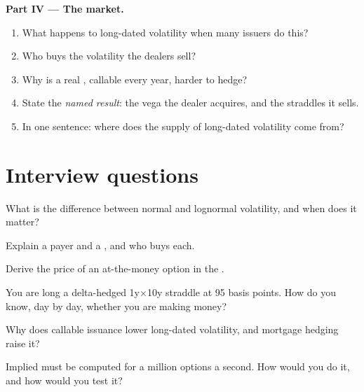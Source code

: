 \begin{problem}
\medskip\noindent\textbf{Part IV --- The market.}
\begin{enumerate}[resume]
\item What happens to long-dated  volatility when many issuers do this?
\item Who buys the volatility the dealers sell?
\item Why is a real , callable every year, harder to hedge?
\item State the \emph{named result}: the vega the dealer acquires, and the
straddles it sells.
\item In one sentence: where does the supply of long-dated volatility come from?
\end{enumerate}
\end{problem}

\section{Interview questions}

\begin{interviewq}\label{iq:m2:the-rates-options-market:1}
What is the difference between normal and lognormal volatility, and when does
it matter?
\end{interviewq}

\begin{interviewq}\label{iq:m2:the-rates-options-market:2}
Explain a payer and a , and who buys each.
\end{interviewq}

\begin{interviewq}\label{iq:m2:the-rates-options-market:3}
Derive the price of an at-the-money option in the .
\end{interviewq}

\begin{interviewq}\label{iq:m2:the-rates-options-market:4}
You are long a delta-hedged 1y$\times$10y straddle at 95 basis points. How do
you know, day by day, whether you are making money?
\end{interviewq}

\begin{interviewq}\label{iq:m2:the-rates-options-market:5}
Why does callable issuance lower long-dated  volatility, and mortgage
hedging raise it?
\end{interviewq}

\begin{interviewq}\label{iq:m2:the-rates-options-market:6}
Implied  must be computed for a million options a second.
How would you do it, and how would you test it?
\end{interviewq}
